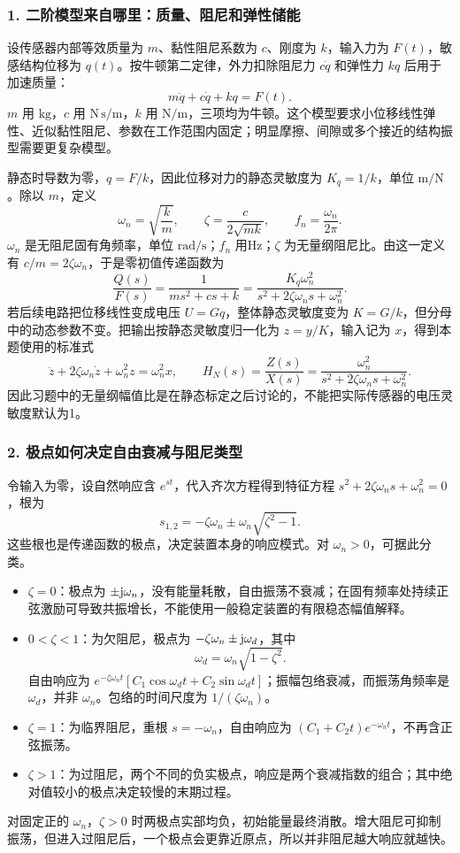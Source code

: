\subsubsection*{1. 二阶模型来自哪里：质量、阻尼和弹性储能}
设传感器内部等效质量为 $m$、黏性阻尼系数为 $c$、刚度为 $k$，输入力为 $F(t)$，敏感结构位移为 $q(t)$。按牛顿第二定律，外力扣除阻尼力 $c\dot q$ 和弹性力 $kq$ 后用于加速质量：
\[
m\ddot q+c\dot q+kq=F(t).
\]
$m$ 用 $\mathrm{kg}$，$c$ 用 $\mathrm{N\,s/m}$，$k$ 用 $\mathrm{N/m}$，三项均为牛顿。这个模型要求小位移线性弹性、近似黏性阻尼、参数在工作范围内固定；明显摩擦、间隙或多个接近的结构振型需要更复杂模型。

静态时导数为零，$q=F/k$，因此位移对力的静态灵敏度为 $K_q=1/k$，单位 $\mathrm{m/N}$。除以 $m$，定义
\[
\boxed{\omega_n=\sqrt{\frac{k}{m}},\qquad
\zeta=\frac{c}{2\sqrt{mk}},\qquad f_n=\frac{\omega_n}{2\pi}}.
\]
$\omega_n$ 是无阻尼固有角频率，单位 $\mathrm{rad/s}$；$f_n$ 用Hz；$\zeta$ 为无量纲阻尼比。由这一定义有 $c/m=2\zeta\omega_n$，于是零初值传递函数为
\[
\frac{Q(s)}{F(s)}=\frac{1}{ms^2+cs+k}
=\frac{K_q\omega_n^2}{s^2+2\zeta\omega_ns+\omega_n^2}.
\]
若后续电路把位移线性变成电压 $U=Gq$，整体静态灵敏度变为 $K=G/k$，但分母中的动态参数不变。把输出按静态灵敏度归一化为 $z=y/K$，输入记为 $x$，得到本题使用的标准式
\[
\ddot z+2\zeta\omega_n\dot z+\omega_n^2z=\omega_n^2x,
\qquad H_N(s)=\frac{Z(s)}{X(s)}
=\frac{\omega_n^2}{s^2+2\zeta\omega_ns+\omega_n^2}.
\]
因此习题中的无量纲幅值比是在静态标定之后讨论的，不能把实际传感器的电压灵敏度默认为1。

\subsubsection*{2. 极点如何决定自由衰减与阻尼类型}
令输入为零，设自然响应含 $e^{st}$，代入齐次方程得到特征方程
$s^2+2\zeta\omega_ns+\omega_n^2=0$，根为
\[
s_{1,2}=-\zeta\omega_n\pm\omega_n\sqrt{\zeta^2-1}.
\]
这些根也是传递函数的极点，决定装置本身的响应模式。对 $\omega_n>0$，可据此分类。
\begin{itemize}[leftmargin=*]
\item $\zeta=0$：极点为 $\pm\mathrm{j}\omega_n$，没有能量耗散，自由振荡不衰减；在固有频率处持续正弦激励可导致共振增长，不能使用一般稳定装置的有限稳态幅值解释。
\item $0<\zeta<1$：为欠阻尼，极点为 $-\zeta\omega_n\pm\mathrm{j}\omega_d$，其中
\[
\omega_d=\omega_n\sqrt{1-\zeta^2}.
\]
自由响应为 $e^{-\zeta\omega_nt}[C_1\cos\omega_dt+C_2\sin\omega_dt]$；振幅包络衰减，而振荡角频率是 $\omega_d$，并非 $\omega_n$。包络的时间尺度为 $1/(\zeta\omega_n)$。
\item $\zeta=1$：为临界阻尼，重根 $s=-\omega_n$，自由响应为 $(C_1+C_2t)e^{-\omega_nt}$，不再含正弦振荡。
\item $\zeta>1$：为过阻尼，两个不同的负实极点，响应是两个衰减指数的组合；其中绝对值较小的极点决定较慢的末期过程。
\end{itemize}
对固定正的 $\omega_n$，$\zeta>0$ 时两极点实部均负，初始能量最终消散。增大阻尼可抑制振荡，但进入过阻尼后，一个极点会更靠近原点，所以并非阻尼越大响应就越快。

